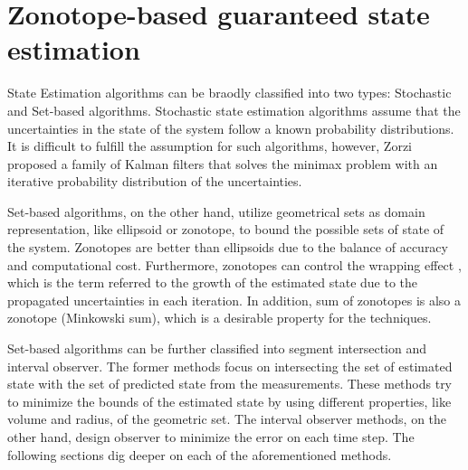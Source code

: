 \chapter{Zonotope-based guaranteed state estimation} \label{ch:state_estimation}
State Estimation algorithms can be braodly classified into two types: Stochastic and Set-based algorithms. Stochastic state estimation algorithms assume that the uncertainties in the state of the system follow a known probability distributions. It is difficult to fulfill the assumption for such algorithms, however, Zorzi \cite{Zorzi2017} proposed a family of Kalman filters that solves the minimax problem with an iterative probability distribution of the uncertainties.

Set-based algorithms, on the other hand, utilize geometrical sets as domain representation, like ellipsoid or zonotope, to bound the possible sets of state of the system. Zonotopes are better than ellipsoids due to the balance of accuracy and computational cost. Furthermore, zonotopes can control the wrapping effect \cite{Kuhn1998}, which is the term referred to the growth of the estimated state due to the propagated uncertainties in each iteration. In addition, sum of zonotopes is also a zonotope (Minkowski sum), which is a desirable property for the techniques.

Set-based algorithms can be further classified into segment intersection and interval observer. The former methods focus on intersecting the set of estimated state with the set of predicted state from the measurements. These methods try to minimize the bounds of the estimated state by using different properties, like volume and radius, of the geometric set. The interval observer methods, on the other hand, design observer to minimize the error on each time step. The following sections dig deeper on each of the aforementioned methods.

